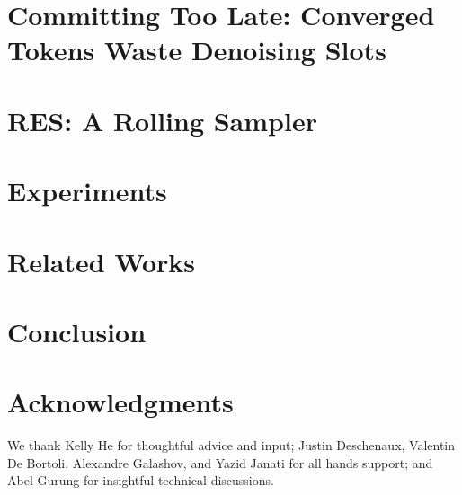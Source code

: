 \documentclass[11pt, a4paper, logo, copyright, gdm]{google}
\begin{document}
\section{Committing Too Late: Converged Tokens Waste Denoising Slots}
\label{sec:too-late}


\section{RES: A Rolling Sampler}
\label{sec:method}


\section{Experiments}
\label{sec:experiments}


\section{Related Works}
\label{sec:adjacentworks}


\section{Conclusion}


\section*{Acknowledgments}
We thank Kelly He for thoughtful advice and input; Justin Deschenaux, Valentin De Bortoli, Alexandre Galashov, and Yazid Janati for all hands support; and Abel Gurung for insightful technical discussions.
\clearpage
\begingroup
\small
\setlength{\bibsep}{4pt}
\setlength{\parskip}{0pt}


\endgroup

\clearpage
\appendix

\end{document}
